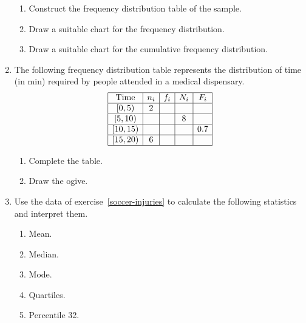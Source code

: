 \begin{enumerate}[leftmargin=*]
\begin{enumerate}
\item Construct the frequency distribution table of the sample.
\item Draw a suitable chart for the frequency distribution.
\item Draw a suitable chart for the cumulative frequency distribution.
\end{enumerate}

\item The following frequency distribution table represents the distribution of time (in min) required by people
attended in a medical dispensary.
\[
\begin{array}{|c|c|c|c|c|}
\hline \mbox{Time} & n_{i} & f_{i} & N_{i} & F_{i}\\
\hline
\left[ 0,5\right) & 2 &  &  &  \\
\hline
\left[ 5,10\right) &  &  & 8 &  \\
\hline
\left[ 10,15\right) &  & &  & 0.7 \\
\hline
\left[ 15,20\right) & 6 &  &  &\\
\hline
\end{array}
\]

\begin{enumerate}
\item Complete the table.
\item Draw the ogive.
\end{enumerate}

\item Use the data of exercise~\ref{soccer-injuries} to calculate the following statistics and interpret them.
\begin{enumerate}
\item Mean.
\item Median.
\item Mode.
\item Quartiles.
\item Percentile 32.
\end{enumerate}




\end{enumerate}
